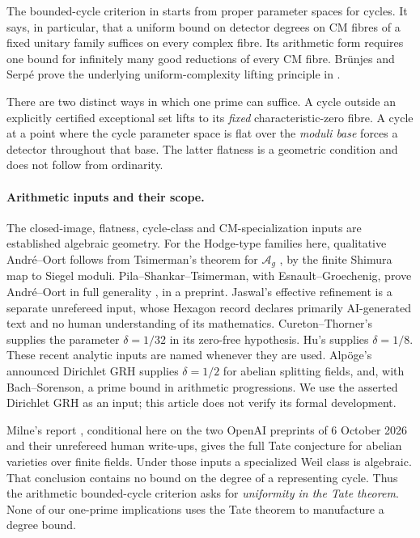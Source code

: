 \documentclass[11pt]{article}
\theoremstyle{definition}
\theoremstyle{remark}
\begin{document}
The bounded-cycle criterion in \cite[Family criterion and section on
one finite-field detector]{Bounded} starts from proper parameter
spaces for cycles. It says, in particular, that a uniform bound on
detector degrees on CM fibres of a fixed unitary family suffices on
every complex fibre. Its arithmetic form requires one bound for
infinitely many good reductions of every CM fibre. Br\"unjes and
Serp\'e prove the underlying uniform-complexity lifting principle
in \cite[Theorem 3.4, p.~8]{BrunjesSerpe}.

There are two distinct ways in which one prime can suffice. A
cycle outside an explicitly certified exceptional set lifts to its
\emph{fixed} characteristic-zero fibre. A cycle at a point where
the cycle parameter space is flat over the \emph{moduli base}
forces a detector throughout that base. The latter flatness is a
geometric condition and does not follow from ordinarity.

\paragraph{Arithmetic inputs and their scope.}
The closed-image, flatness, cycle-class and CM-specialization inputs
are established algebraic geometry. For the Hodge-type families here,
qualitative Andr\'e--Oort follows from Tsimerman's theorem for
$\mathcal A_g$ \cite[Theorem~1.3, p.~380]{Tsimerman}, by the
finite Shimura map to Siegel moduli. Pila--Shankar--Tsimerman, with
Esnault--Groechenig, prove Andr\'e--Oort in full generality
\cite[Theorem~1.1]{PST}, in a preprint. Jaswal's effective refinement
\cite[Theorem 1.1(ii)]{Jaswal} is a separate unrefereed input, whose
Hexagon record declares primarily AI-generated text and no human
understanding of its mathematics. Cureton--Thorner's
\cite[Theorem 1.1]{CuretonThorner} supplies the parameter
$\delta=1/32$ in its zero-free hypothesis. Hu's
\cite[Theorem 1.2]{Hu} supplies $\delta=1/8$. These recent analytic
inputs are named whenever they are used. Alp\"oge's announced
Dirichlet GRH \cite[p.~1]{Alpoge} supplies $\delta=1/2$ for abelian
splitting fields, and, with Bach--Sorenson, a prime bound in
arithmetic progressions. We use the asserted Dirichlet GRH as an
input; this article does not verify its formal development.

Milne's report \cite[Theorem 3.1]{MilneReport}, conditional here on
the two OpenAI preprints of 6 October 2026 and their unrefereed
human write-ups, gives the full Tate conjecture for abelian varieties
over finite fields. Under those inputs a specialized Weil class is
algebraic. That conclusion contains no bound on the degree of a
representing cycle. Thus the arithmetic bounded-cycle criterion
asks for \emph{uniformity in the Tate theorem}. None of our
one-prime implications uses the Tate theorem to manufacture a
degree bound.
\end{document}
